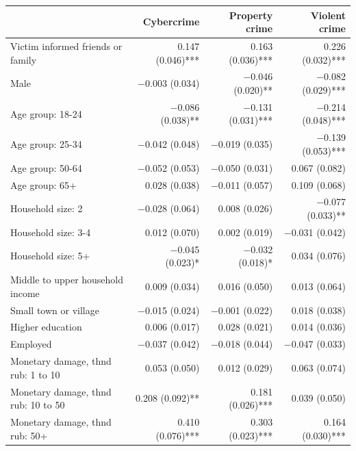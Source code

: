 \begingroup
\centering
\begin{tabular}{lrrr}
	\addlinespace[5pt] 
	& Cybercrime & Property crime & Violent crime \\  
	\midrule
	Victim informed friends or family & \num{0.147} (\num{0.046})*** & \num{0.163} (\num{0.036})*** & \num{0.226} (\num{0.032})*** \\
	Male & \num{-0.003} (\num{0.034}) & \num{-0.046} (\num{0.020})** & \num{-0.082} (\num{0.029})*** \\
	Age group: 18-24 & \num{-0.086} (\num{0.038})** & \num{-0.131} (\num{0.031})*** & \num{-0.214} (\num{0.048})*** \\
	Age group: 25-34 & \num{-0.042} (\num{0.048}) & \num{-0.019} (\num{0.035}) & \num{-0.139} (\num{0.053})*** \\
	Age group: 50-64 & \num{-0.052} (\num{0.053}) & \num{-0.050} (\num{0.031}) & \num{0.067} (\num{0.082}) \\
	Age group:   65+ & \num{0.028} (\num{0.038}) & \num{-0.011} (\num{0.057}) & \num{0.109} (\num{0.068}) \\
	Household size:   2 & \num{-0.028} (\num{0.064}) & \num{0.008} (\num{0.026}) & \num{-0.077} (\num{0.033})** \\
	Household size: 3-4 & \num{0.012} (\num{0.070}) & \num{0.002} (\num{0.019}) & \num{-0.031} (\num{0.042}) \\
	Household size:  5+ & \num{-0.045} (\num{0.023})* & \num{-0.032} (\num{0.018})* & \num{0.034} (\num{0.076}) \\
	Middle to upper household income & \num{0.009} (\num{0.034}) & \num{0.016} (\num{0.050}) & \num{0.013} (\num{0.064}) \\
	Small town or village & \num{-0.015} (\num{0.024}) & \num{-0.001} (\num{0.022}) & \num{0.018} (\num{0.038}) \\
	Higher education & \num{0.006} (\num{0.017}) & \num{0.028} (\num{0.021}) & \num{0.014} (\num{0.036}) \\
	Employed & \num{-0.037} (\num{0.042}) & \num{-0.018} (\num{0.044}) & \num{-0.047} (\num{0.033}) \\
	Monetary damage, thnd rub:  1 to 10 & \num{0.053} (\num{0.050}) & \num{0.012} (\num{0.029}) & \num{0.063} (\num{0.074}) \\
	Monetary damage, thnd rub: 10 to 50 & \num{0.208} (\num{0.092})** & \num{0.181} (\num{0.026})*** & \num{0.039} (\num{0.050}) \\
	Monetary damage, thnd rub:      50+ & \num{0.410} (\num{0.076})*** & \num{0.303} (\num{0.023})*** & \num{0.164} (\num{0.030})*** \\

\end{tabular}
